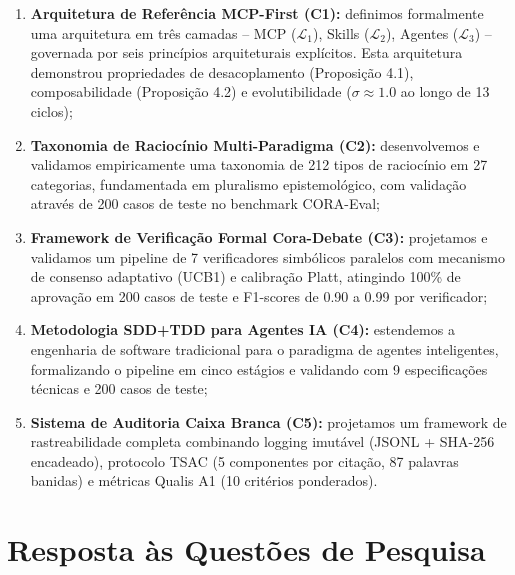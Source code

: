 \documentclass[12pt,a4paper,sumario=tradicional]{abntex2}
\begin{document}
\begin{enumerate}[leftmargin=*]
    \item \textbf{Arquitetura de Referência MCP-First (C1):} definimos formalmente uma arquitetura em três camadas -- MCP ($\mathcal{L}_1$), Skills ($\mathcal{L}_2$), Agentes ($\mathcal{L}_3$) -- governada por seis princípios arquiteturais explícitos. Esta arquitetura demonstrou propriedades de desacoplamento (Proposição 4.1), composabilidade (Proposição 4.2) e evolutibilidade ($\sigma \approx 1.0$ ao longo de 13 ciclos);
    
    \item \textbf{Taxonomia de Raciocínio Multi-Paradigma (C2):} desenvolvemos e validamos empiricamente uma taxonomia de 212 tipos de raciocínio em 27 categorias, fundamentada em pluralismo epistemológico, com validação através de 200 casos de teste no benchmark CORA-Eval;
    
    \item \textbf{Framework de Verificação Formal Cora-Debate (C3):} projetamos e validamos um pipeline de 7 verificadores simbólicos paralelos com mecanismo de consenso adaptativo (UCB1) e calibração Platt, atingindo 100\% de aprovação em 200 casos de teste e F1-scores de 0.90 a 0.99 por verificador;
    
    \item \textbf{Metodologia SDD+TDD para Agentes IA (C4):} estendemos a engenharia de software tradicional para o paradigma de agentes inteligentes, formalizando o pipeline em cinco estágios e validando com 9 especificações técnicas e 200 casos de teste;
    
    \item \textbf{Sistema de Auditoria Caixa Branca (C5):} projetamos um framework de rastreabilidade completa combinando logging imutável (JSONL + SHA-256 encadeado), protocolo TSAC (5 componentes por citação, 87 palavras banidas) e métricas Qualis A1 (10 critérios ponderados).
\end{enumerate}

\section{Resposta às Questões de Pesquisa}
\end{document}
